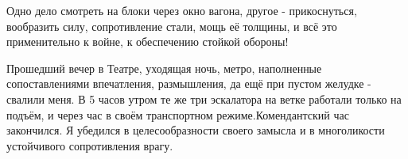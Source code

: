 \label{240-1}


\label{241-1}
Одно дело смотреть на блоки через окно вагона, другое - прикоснуться, вообразить силу, сопротивление стали, мощь её толщины, и всё это применительно к войне, к обеспечению стойкой обороны!

Прошедший вечер в Театре, уходящая ночь, метро, наполненные сопоставлениями впечатления, размышления, да ещё при пустом желудке - свалили меня. В 5 часов утром те же три эскалатора на ветке работали только на подъём, и через час в своём транспортном режиме.Комендантский час закончился. Я убедился в целесообразности своего замысла и в многоликости устойчивого сопротивления врагу.
